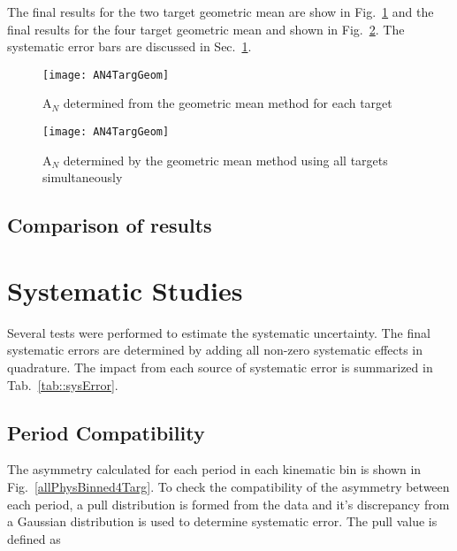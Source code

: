 \noindent
The final results for the two target geometric mean are show in
Fig.~\ref{fig::ANgeom} and the final results for the four target geometric mean
and shown in Fig.~\ref{fig::AN4TargGeom}.  The systematic error bars are
discussed in Sec.~\ref{sec::systematics}.

\begin{figure}[h!t]
  \begin{center}
    \texttt{[image: AN4TargGeom]}
    \caption{A$_N$ determined from the geometric mean method for each target}
    \label{fig::ANgeom}
  \end{center}
\end{figure}

\begin{figure}[h!]
  \begin{center}
    \texttt{[image: AN4TargGeom]}
    \caption{A$_N$ determined by the geometric mean method using all targets
      simultaneously}
    \label{fig::AN4TargGeom}
  \end{center}
\end{figure}

\subsection{Comparison of results}


\section{Systematic Studies} \label{sec::systematics}
Several tests were performed to estimate the systematic uncertainty.  The final
systematic errors are determined by adding all non-zero systematic effects in
quadrature.  The impact from each source of systematic error is summarized in
Tab.~\ref{tab::sysError}.

\subsection{Period Compatibility}
The asymmetry calculated for each period in each kinematic bin is shown in
Fig.~\ref{allPhysBinned4Targ}.  To check the compatibility of the asymmetry
between each period, a pull distribution is formed from the data and it's
discrepancy from a Gaussian distribution is used to determine systematic error.
The pull value is defined as

